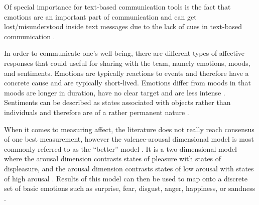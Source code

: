 Of special importance for text-based communication tools is the fact that emotions are an important part of communication and can get lost/misunderstood inside text messages due to the lack of cues in text-based communication \autocite{hook2008interactional}.


In order to communicate one's well-being, there are different types of affective responses that could useful for sharing with the team, namely emotions, moods, and sentiments. Emotions are typically reactions to events and therefore have a concrete cause and are typically short-lived. Emotions differ from moods in that moods are longer in duration, have no clear target and are less intense \autocite{frijda1994varieties, brave2007emotion}. Sentiments can be described as states associated with objects rather than individuals and therefore are of a rather permanent nature \autocite{brave2007emotion}.

When it comes to measuring affect, the literature does not really reach consensus of one best measurement, however the valence-arousal dimensional model is most commonly referred to as the ``better'' model \autocite{russell1980circumplex, mauss2009measures}. It is a two-dimensional model where the arousal dimension contrasts states of pleasure with states of displeasure, and the arousal dimension contrasts states of low arousal with states of high arousal \autocite{mauss2009measures}. Results of this model can then be used to map onto a discrete set of basic emotions such as surprise, fear, disgust, anger, happiness, or sandness \autocite{brave2007emotion}.